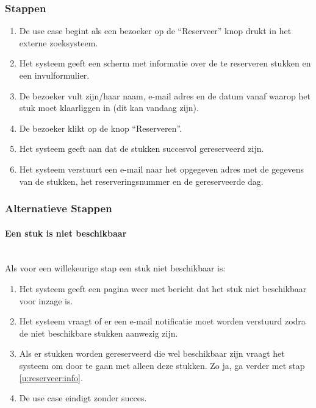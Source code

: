 \documentclass[a4paper,titlepage]{report}
\begin{document}
      \subsubsection{Stappen}
        \begin{enumerate}
          \item\label{u:reserveer:begin}
            De use case begint als een bezoeker op de ``Reserveer'' knop
            drukt in het externe zoeksysteem.
          \item\label{u:reserveer:info}
            Het systeem geeft een scherm met informatie over de te reserveren
            stukken en een invulformulier.
          \item De bezoeker vult zijn/haar naam, e-mail adres en de datum
            vanaf waarop het stuk moet klaarliggen in (dit kan vandaag zijn).
          \item\label{u:reserveer:submit}
            De bezoeker klikt op de knop ``Reserveren''.
          \item Het systeem geeft aan dat de stukken succesvol gereserveerd
            zijn.
          \item Het systeem verstuurt een e-mail naar het opgegeven adres met
            de gegevens van de stukken, het reserveringsnummer en de
            gereserveerde dag.
          \end{enumerate}
      \subsubsection{Alternatieve Stappen}
        \paragraph{Een stuk is niet beschikbaar}\hfill\\
          Als voor een willekeurige stap een stuk niet beschikbaar is:
          \begin{enumerate}
            \item Het systeem geeft een pagina weer met bericht dat het stuk
            niet beschikbaar voor inzage is.
            \item Het systeem vraagt of er een e-mail notificatie moet worden
            verstuurd zodra de niet beschikbare stukken aanwezig zijn.
            \item Als er stukken worden gereserveerd die wel beschikbaar zijn
            vraagt het systeem om door te gaan met alleen deze stukken. Zo ja,
            ga verder met stap \ref{u:reserveer:info}.
            \item De use case eindigt zonder succes.
          \end{enumerate}
\end{document}
